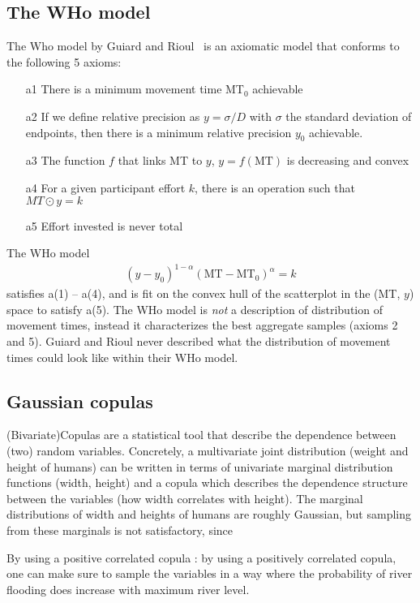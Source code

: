 \documentclass[12pt,a4paper]{article}
\begin{document}
\subsection{The WHo model}
The Who model by Guiard and Rioul~\cite{guiard2015} is an axiomatic model that conforms to the following 5 axioms:
\begin{enumerate}
	\item[a1] There is a minimum movement time MT$_0$ achievable
	\item[a2] If we define relative precision as $y = \sigma/D$ with $\sigma$ the standard deviation of endpoints, then there is a minimum relative precision $y_0$ achievable.
	\item[a3] The function $f$ that links MT to $y$, $y=f(\text{MT})$ is decreasing and convex
	\item[a4] For a given participant effort $k$, there is an operation such that $MT \odot y = k$
	\item[a5] Effort invested is never total
\end{enumerate}
The WHo model
\begin{align}
	(y-y_0)^{1-\alpha} (\text{MT}-\text{MT}_0)^{\alpha} = k
\end{align}
satisfies a(1) -- a(4), and is fit on the convex hull of the scatterplot in the (MT, $y$) space to satisfy a(5).
The WHo model is \textit{not} a description of distribution of movement times, instead it characterizes the best aggregate samples (axioms 2 and 5).
Guiard and Rioul never described what the distribution of movement times could look like within their WHo model.


\subsection{Gaussian copulas}
(Bivariate)Copulas are a statistical tool that describe the dependence between (two) random variables. Concretely, a multivariate joint distribution (\eg weight and height of humans) can be written in terms of univariate marginal distribution functions (width, height) and a copula which describes the dependence structure between the variables (how width correlates with height).
The marginal distributions of width and heights of humans are roughly Gaussian, but sampling from these marginals is not satisfactory, since


By using a positive correlated copula : by using a positively correlated copula, one can make sure to sample the variables in a way where the probability of river flooding does increase with maximum river level.
\end{document}
